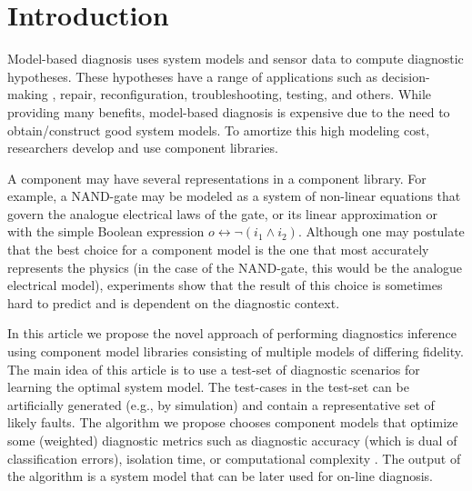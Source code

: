 \section{Introduction}
%
Model-based diagnosis \citep{dekleer87diagnosing} uses system models
and sensor data to compute diagnostic hypotheses. These hypotheses
have a range of applications such as decision-making
\citep{feldman13genius}, repair, reconfiguration, troubleshooting,
testing, and others. While providing many benefits, model-based
diagnosis is expensive due to the need to obtain/construct good system
models. To amortize this high modeling cost, researchers develop and
use component libraries.
\par
A component may have several representations in a component
library. For example, a NAND-gate may be modeled as a system of
non-linear equations that govern the analogue electrical laws of the
gate, or its linear approximation or with the simple Boolean
expression $o \leftrightarrow \neg(i_1 \wedge i_2)$. Although one may
postulate that the best choice for a component model is the one that
most accurately represents the physics (in the case of the NAND-gate,
this would be the analogue electrical model), experiments show that
the result of this choice is sometimes hard to predict and is
dependent on the diagnostic context.
\par
In this article we propose the novel approach of performing
diagnostics inference using component model
libraries consisting of multiple models of differing fidelity. 
The main idea of this article is to use a test-set of diagnostic
scenarios for learning the optimal system model. The test-cases in the
test-set can be artificially generated (e.g., by simulation) and
contain a representative set of likely faults. The algorithm we
propose chooses component models that optimize some (weighted)
diagnostic metrics such as diagnostic accuracy (which is dual of
classification errors), isolation time, or computational complexity
\citep{feldman10empirical}. The output of the algorithm is a system
model that can be later used for on-line diagnosis.
